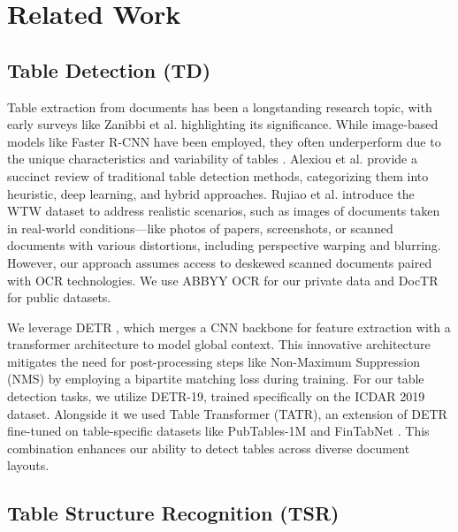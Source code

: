 \section{Related Work}
\label{sec:related-work}

\subsection{Table Detection (TD)}

Table extraction from documents has been a longstanding research topic, with early surveys like Zanibbi et al. \cite{Zanibbi2004ASO} highlighting its significance. While image-based models like Faster R-CNN \cite{Ren2015FasterRT} have been employed, they often underperform due to the unique characteristics and variability of tables \cite{Smock2021PubTables1MTC}. Alexiou et al. \cite{Alexiou2023AnEO} provide a succinct review of traditional table detection methods, categorizing them into heuristic, deep learning, and hybrid approaches. Rujiao et al. introduce the WTW dataset \cite{Long2021ParsingTS} to address realistic scenarios, such as images of documents taken in real-world conditions—like photos of papers, screenshots, or scanned documents with various distortions, including perspective warping and blurring. However, our approach assumes access to deskewed scanned documents paired with OCR technologies. We use ABBYY OCR for our private data and DocTR \cite{doctr2021} for public datasets.

We leverage DETR \cite{Carion2020EndtoEndOD}, which merges a CNN backbone for feature extraction with a transformer architecture to model global context. This innovative architecture mitigates the need for post-processing steps like Non-Maximum Suppression (NMS) by employing a bipartite matching loss during training. For our table detection tasks, we utilize DETR-19, trained specifically on the ICDAR 2019 dataset. Alongside it we used Table Transformer (TATR), an extension of DETR fine-tuned on table-specific datasets like PubTables-1M \cite{Smock2021PubTables1MTC} and FinTabNet \cite{Zheng2020GlobalTE}. This combination enhances our ability to detect tables across diverse document layouts.

\subsection{Table Structure Recognition (TSR)}

